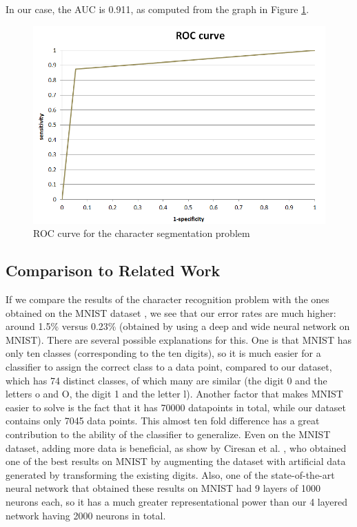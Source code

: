 In our case, the AUC is 0.911, as computed from the graph in Figure \ref{fig:roc}. 


\begin{figure}[h!]
\begin{center}
\includegraphics[width=0.7\columnwidth]{img/roc.png}
\caption{\label{fig:roc}
ROC curve for the character segmentation problem}
\end{center}
\end{figure}

\subsection{Comparison to Related Work}
If we compare the results of the character recognition problem with the ones obtained on the MNIST dataset \cite{lecun1998mnist}, we see that our error rates are much higher: around 1.5\% versus 0.23\% (obtained by using a deep and wide neural network on MNIST). There are several possible explanations for this. One is that MNIST has only ten classes (corresponding to the ten digits), so it is much easier for a classifier to assign the correct class to a data point, compared to our dataset, which has 74 distinct classes, of which many are similar (the digit 0 and the letters o and O, the digit 1 and the letter l). Another factor that makes MNIST easier to solve is the fact that it has 70000 datapoints in total, while our dataset contains only 7045 data points. This almost ten fold difference has a great contribution to the ability of the classifier to generalize. Even on the MNIST dataset, adding more data is beneficial, as show by Ciresan et al. \cite{Cire_an_2010}, who obtained one of the best results on MNIST by augmenting the dataset with artificial data generated by transforming the existing digits. Also, one of the state-of-the-art neural network that obtained these results on MNIST had 9 layers of 1000 neurons each, so it has a much greater representational power than our 4 layered network having 2000 neurons in total. 

